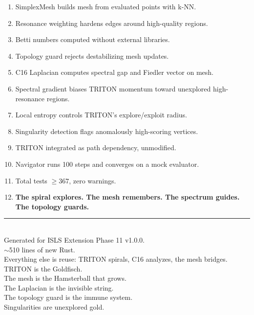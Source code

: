 \documentclass[11pt,a4paper,twoside]{article}
\theoremstyle{definition}
\theoremstyle{plain}
\theoremstyle{remark}
\newcommand{\ISLS}{\textsf{ISLS}}
\begin{document}
\begin{enumerate}[nosep]
  \item SimplexMesh builds mesh from evaluated points with k-NN.
  \item Resonance weighting hardens edges around high-quality regions.
  \item Betti numbers computed without external libraries.
  \item Topology guard rejects destabilizing mesh updates.
  \item C16 Laplacian computes spectral gap and Fiedler vector on mesh.
  \item Spectral gradient biases TRITON momentum toward unexplored
        high-resonance regions.
  \item Local entropy controls TRITON's explore/exploit radius.
  \item Singularity detection flags anomalously high-scoring vertices.
  \item TRITON integrated as path dependency, unmodified.
  \item Navigator runs 100 steps and converges on a mock evaluator.
  \item Total tests $\ge 367$, zero warnings.
  \item \textbf{The spiral explores. The mesh remembers.
        The spectrum guides. The topology guards.}
\end{enumerate}

\vfill
\begin{center}
\rule{0.5\textwidth}{0.4pt}\\[0.5cm]
{\small Generated for \ISLS{} Extension Phase 11 v1.0.0.\\[0.2cm]
$\sim$510 lines of new Rust.\\
Everything else is reuse: TRITON spirals, C16 analyzes, the mesh bridges.\\[0.3cm]
TRITON is the Goldfisch.\\
The mesh is the Hamsterball that grows.\\
The Laplacian is the invisible string.\\
The topology guard is the immune system.\\
Singularities are unexplored gold.}
\end{center}
\end{document}
